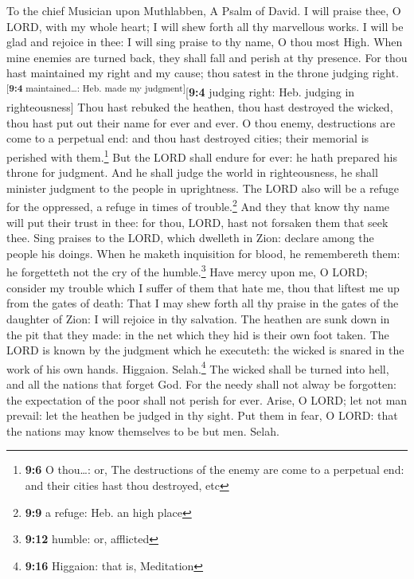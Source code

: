 To the chief Musician upon Muthlabben, A Psalm of David. 
I will praise thee, O LORD, with my whole heart; I will shew forth all
thy marvellous works.  I will be glad and rejoice in thee:
I will sing praise to thy name, O thou most High.  When
mine enemies are turned back, they shall fall and perish at thy
presence.  For thou hast maintained my right and my cause;
thou satest in the throne judging right.\textsuperscript{{[}\textbf{9:4}
maintained\ldots: Heb. made my judgment{]}}{[}\textbf{9:4} judging
right: Heb. judging in righteousness{]}  Thou hast rebuked
the heathen, thou hast destroyed the wicked, thou hast put out their
name for ever and ever.  O thou enemy, destructions are
come to a perpetual end: and thou hast destroyed cities; their memorial
is perished with them.\footnote{\textbf{9:6} O thou\ldots: or, The
  destructions of the enemy are come to a perpetual end: and their
  cities hast thou destroyed, etc}  But the LORD shall
endure for ever: he hath prepared his throne for judgment.
 And he shall judge the world in righteousness, he shall
minister judgment to the people in uprightness.  The LORD
also will be a refuge for the oppressed, a refuge in times of
trouble.\footnote{\textbf{9:9} a refuge: Heb. an high place}
 And they that know thy name will put their trust in
thee: for thou, LORD, hast not forsaken them that seek thee.
 Sing praises to the LORD, which dwelleth in Zion:
declare among the people his doings.  When he maketh
inquisition for blood, he remembereth them: he forgetteth not the cry of
the humble.\footnote{\textbf{9:12} humble: or, afflicted}
 Have mercy upon me, O LORD; consider my trouble which I
suffer of them that hate me, thou that liftest me up from the gates of
death:  That I may shew forth all thy praise in the gates
of the daughter of Zion: I will rejoice in thy salvation.
 The heathen are sunk down in the pit that they made: in
the net which they hid is their own foot taken.  The LORD
is known by the judgment which he executeth: the wicked is snared in the
work of his own hands. Higgaion. Selah.\footnote{\textbf{9:16} Higgaion:
  that is, Meditation}  The wicked shall be turned into
hell, and all the nations that forget God.  For the needy
shall not alway be forgotten: the expectation of the poor shall not
perish for ever.  Arise, O LORD; let not man prevail: let
the heathen be judged in thy sight.  Put them in fear, O
LORD: that the nations may know themselves to be but men. Selah.

